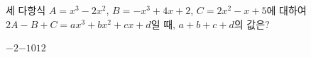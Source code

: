 세 다항식 $A=x^3-2x^2$, $B=-x^3+4x+2$, $C=2x^2-x+5$에 대하여 $2A-B+C=ax^3+bx^2+cx+d$일 때, $a+b+c+d$의 값은? 
\begin{choices32}{$-2$}{$-1$}{$0$}{$1$}{$2$}\end{choices32}
